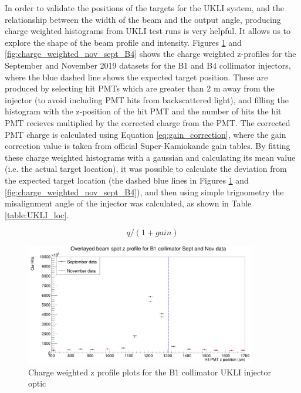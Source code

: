 In order to validate the positions of the targets for the UKLI system, and the relationship between the width of the beam and the output angle, producing charge weighted histograms from UKLI test runs is very helpful. It allows us to explore the shape of the beam profile and intensity. Figures \ref{fig:charge_weighted_nov_sept_B1} and \ref{fig:charge_weighted_nov_sept_B4} shows the charge weighted z-profiles for the September and November 2019 datasets for the B1 and B4 collimator injectors, where the blue dashed line shows the expected target position. These are produced by selecting hit PMTs which are greater than 2 m away from the injector (to avoid including PMT hits from backscattered light), and filling the histogram with the z-position of the hit PMT and the number of hits the hit PMT recieves multiplied by the corrected charge from the PMT. The corrected PMT charge is calculated using Equation \ref{eq:gain_correction}, where the gain correction value is taken from official Super-Kamiokande gain tables. By fitting these charge weighted histograms with a gaussian and calculating its mean value (i.e. the actual target location), it was possible to calculate the deviation from the expected target location (the dashed blue lines in Figures \ref{fig:charge_weighted_nov_sept_B1} and \ref{fig:charge_weighted_nov_sept_B4}), and then using simple trignometry the misalignment angle of the injector was calculated, as shown in Table \ref{table:UKLI_loc}.

\begin{equation}
    q/(1 + gain)
\label{eq:gain_correction}
\end{equation}

\begin{figure}
    \centering
    \includegraphics[width=0.9\textwidth]{Figures/charge_weighted_nov_sept_B1.PNG}
    \caption{Charge weighted z profile plots for the B1 collimator UKLI injector optic}
    \label{fig:charge_weighted_nov_sept_B1}
\end{figure}

